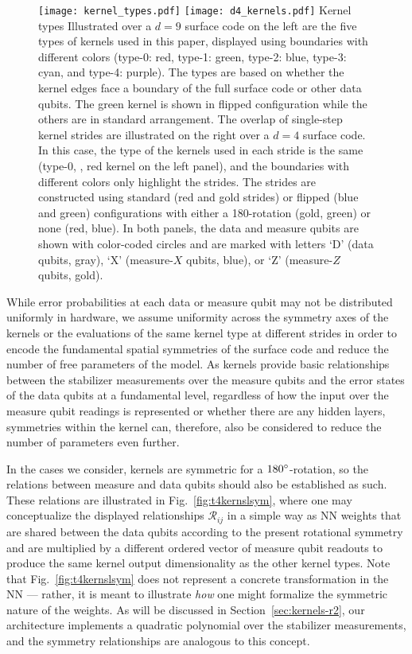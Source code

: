 \begin{figure*}[htb]
\centering
\texttt{[image: kernel\_types.pdf]}
\texttt{[image: d4\_kernels.pdf]}
\ccaption
{Kernel types}
{
Illustrated over a $d=9$ surface code on the left are the five types of kernels used in this paper, displayed using boundaries with different colors (type-0: red, type-1: green, type-2: blue, type-3: cyan, and type-4: purple). The types are based on whether the kernel edges face a boundary of the full surface code or other data qubits. The green kernel is shown in flipped configuration while the others are in standard arrangement.
The overlap of single-step kernel strides are illustrated on the right over a $d=4$ surface code. In this case, the type of the kernels used in each stride is the same (type-0, \ie, red kernel on the left panel), and the boundaries with different colors only highlight the strides. The strides are constructed using standard (red and gold strides) or flipped (blue and green) configurations with either a 180\degrees{}-rotation (gold, green) or none (red, blue).
In both panels, the data and measure qubits are shown with color-coded circles and are marked with letters `D' (data qubits, gray), `X' (measure-$X$ qubits, blue), or `Z' (measure-$Z$ qubits, gold).
}
\label{fig:ktypes}
\end{figure*}

While error probabilities at each data or measure qubit may not be distributed uniformly in hardware, we assume uniformity across the symmetry axes of the kernels or the evaluations of the same kernel type at different strides in order to encode the fundamental spatial symmetries of the surface code and reduce the number of free parameters of the model. As kernels provide basic relationships between the stabilizer measurements over the measure qubits and the error states of the data qubits at a fundamental level, regardless of how the input over the measure qubit readings is represented or whether there are any hidden layers, symmetries within the kernel can, therefore, also be considered to reduce the number of parameters even further. 

In the cases we consider,  kernels are symmetric for a $180^\circ$-rotation, so the relations between measure and data qubits should also be established as such.
These relations are illustrated in Fig.~\ref{fig:t4kernslsym}, where one may conceptualize the displayed relationships $\mathcal{R}_{ij}$ in a simple way as NN weights that are shared between the data qubits according to the present rotational symmetry and are multiplied by a different ordered vector of measure qubit readouts to produce the same kernel output dimensionality as the other kernel types. 
Note that Fig.~\ref{fig:t4kernslsym} does not represent a concrete transformation in the NN --- rather, it is meant to illustrate \emph{how} one might formalize the symmetric nature of the weights.
As will be discussed in Section~\ref{sec:kernels-r2}, our architecture implements a quadratic polynomial over the stabilizer measurements, and the symmetry relationships are analogous to this concept.


